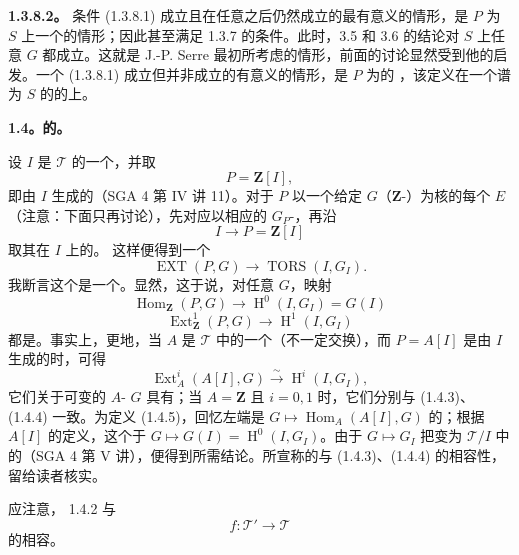 \textbf{1.3.8.2。} 条件 (1.3.8.1) 成立且在任意之后仍然成立的最有意义的情形，是 $P$ 为 $S$ 上一个的情形；因此甚至满足 1.3.7 的条件。此时，3.5 和 3.6 的结论对 $S$ 上任意 $G$ 都成立。这就是 J.-P. Serre 最初所考虑的情形，前面的讨论显然受到他的启发。一个 (1.3.8.1) 成立但并非成立的有意义的情形，是 $P$ 为的 ，该定义在一个谱为 $S$ 的的上。

\textbf{1.4。的。}

设 $I$ 是 $\mathcal T$ 的一个，并取
\[
P=\mathbf Z[I],
\tag{1.4.1}
\]
即由 $I$ 生成的（SGA 4 第 IV 讲 11）。对于 $P$ 以一个给定 $G$（$\mathbf Z$-）为核的每个 $E$（注意：下面只再讨论），先对应以相应的 $G_P$-，再沿
\[
I\longrightarrow P=\mathbf Z[I]
\]
取其在 $I$ 上的。
这样便得到一个
\[
\operatorname{EXT}(P,G)\longrightarrow\operatorname{TORS}(I,G_I).
\tag{1.4.2}
\]
我断言这个是一个。显然，这于说，对任意 $G$，映射
\[
\operatorname{Hom}_{\mathbf Z}(P,G)\longrightarrow\operatorname{H}^0(I,G_I)=G(I)
\tag{1.4.3}
\]
\[
\operatorname{Ext}_{\mathbf Z}^1(P,G)\longrightarrow\operatorname{H}^1(I,G_I)
\tag{1.4.4}
\]
都是。事实上，更地，当 $A$ 是 $\mathcal T$ 中的一个（不一定交换），而 $P=A[I]$ 是由 $I$ 生成的时，可得
\[
\operatorname{Ext}_A^i(A[I],G)\xrightarrow{\sim}\operatorname{H}^i(I,G_I),
\tag{1.4.5}
\]
它们关于可变的 $A$- $G$ 具有；当 $A=\mathbf Z$ 且 $i=0,1$ 时，它们分别与 (1.4.3)、(1.4.4) 一致。为定义 (1.4.5)，回忆左端是 $G\mapsto\operatorname{Hom}_A(A[I],G)$ 的；根据 $A[I]$ 的定义，这个于 $G\mapsto G(I)=\operatorname{H}^0(I,G_I)$。由于 $G\mapsto G_I$ 把变为 $\mathcal T/I$ 中的（SGA 4 第 V 讲），便得到所需结论。所宣称的与 (1.4.3)、(1.4.4) 的相容性，留给读者核实。

应注意， 1.4.2 与
\[
f:\mathcal T'\longrightarrow\mathcal T
\]
的相容。
